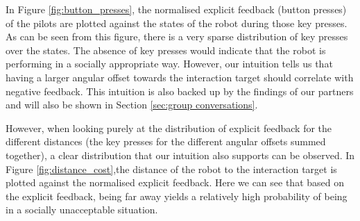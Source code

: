 \documentclass[a4paper,11pt]{report}
\begin{document}
In Figure \ref{fig:button_presses}, the normalised explicit feedback (button presses) of the pilots are plotted against the states of the robot during those key presses.
As can be seen from this figure, there is a very sparse distribution of key presses over the states.
The absence of key presses would indicate that the robot is performing in a socially appropriate way.
However, our intuition tells us that having a larger angular offset towards the interaction target should correlate with negative feedback.
This intuition is also backed up by the findings of our partners\cite{teresa_d3.1} and will also be shown in Section \ref{sec:group conversations}.

However, when looking purely at the distribution of explicit feedback for the different distances (the key presses for the different angular offsets summed together), a clear distribution that our intuition also supports can be observed.
In Figure \ref{fig:distance_cost},the distance of the robot to the interaction target is plotted against the normalised explicit feedback. 
Here we can see that based on the explicit feedback, being far away yields a relatively high probability of being in a socially unacceptable situation.
 
\end{document}
